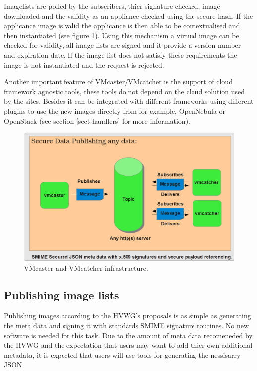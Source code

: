 \documentclass{llncs_Ibergrid2013}
\begin{document}
Imagelists are polled by the subscribers, thier signature checked, image downloaded and the validity as an appliance checked using the secure hash. If the applicance image is valid the applicance is then able to be contextualised and then instantiated (see figure \ref{fig:infrastructure}). 
Using this mechanism a virtual image can be checked for validity, all image lists are signed and it provide a version number and expiration date. If the image list does not satisfy these requirements the image is not instantiated and the request is rejected.

Another important feature of VMcaster/VMcatcher is the support of cloud framework agnostic tools, these tools do not depend on the cloud solution used by the sites. Besides it can be integrated with different frameworks using different plugins to use the new images directly from for example, OpenNebula or OpenStack (see section \ref{sect-handlers} for more information).

\begin{figure}[h]
\centering
\includegraphics[width=1\textwidth]{vmcaster_vmcatcher.png}
\caption{VMcaster and VMcatcher infrastructure.}
\label{fig:infrastructure}
\end{figure}

\subsection{Publishing image lists}
Publishing images according to the HVWG's proposals is as simple as generating the meta data and signing it with standards SMIME signature routines. No new software is needed for this task. Due to the amount of meta data recomeneded by the HVWG and the expectation that users may want to add thier own additional metadata, it is expected that users will use tools for generating the nessisarry JSON 
\end{document}

